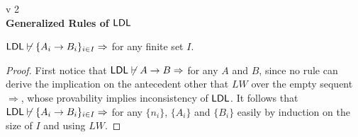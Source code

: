 \documentclass[a4paper, 12pt]{paper}
\begin{document}
{\noindent
  v 2 \\
{\large\textbf{Generalized Rules of $\mathsf{LDL}$}}
}
\\

\begin{lem}
  $\mathsf{LDL} \not \vdash \{ A_i \to B_i \}_{i \in I} \Rightarrow$ for any finite set $I$.
\end{lem}
\begin{proof}
  First notice that $\mathsf{LDL} \not \vdash A \to B \Rightarrow$ for any $A$ and $B$, since no rule can derive the implication on the antecedent other that $LW$ over the empty sequent $\Rightarrow$, whose provability implies inconsistency of $\mathsf{LDL}$. It follows that $\mathsf{LDL} \not \vdash \{ A_i \to B_i \}_{i \in I} \Rightarrow$ for any $\{n_i\}$, $\{ A_i \}$ and $\{ B_i \}$ easily by induction on the size of $I$ and using $LW$.
\end{proof}
\end{document}
